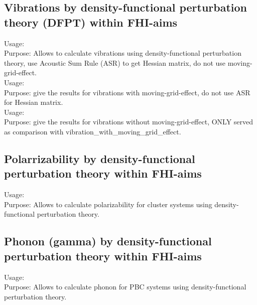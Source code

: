 \subsection*{Vibrations by density-functional perturbation theory (DFPT) within FHI-aims}
{
Usage:  \\[1.0em]
  Purpose:  Allows to calculate vibrations using density-functional perturbation theory, use Acoustic Sum Rule (ASR) to get Hessian matrix, do not use moving-grid-effect.\\


Usage:  \\[1.0em]
  Purpose: give the results for vibrations with moving-grid-effect, do not use ASR for Hessian matrix.\\ 

Usage:  \\[1.0em]
  Purpose: give the results for vibrations without moving-grid-effect, ONLY served as comparison with vibration\_with\_moving\_grid\_effect.\\ }



\subsection*{Polarrizability by density-functional perturbation theory within FHI-aims}
{
Usage:  \\[1.0em]
  Purpose: Allows to calculate polarizability for cluster systems using density-functional perturbation theory.\\ }


\subsection*{Phonon (gamma)  by density-functional perturbation theory within FHI-aims}
{
Usage:  \\[1.0em]
  Purpose: Allows to calculate phonon for PBC systems using density-functional perturbation theory.\\ }

